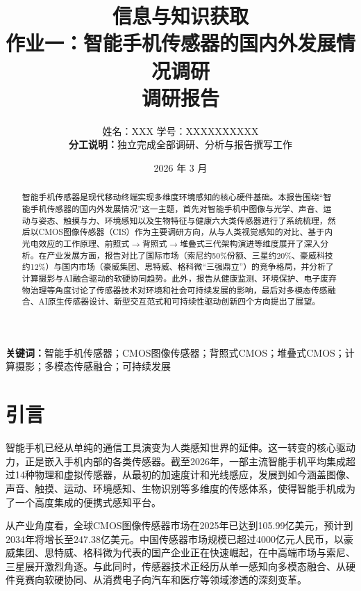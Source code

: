 \documentclass[12pt, a4paper]{ctexart}
\title{
    \vspace{1cm}
    {\LARGE \textbf{信息与知识获取}} \\[0.6cm]
    {\Large 作业一：智能手机传感器的国内外发展情况调研} \\[0.4cm]
    {\large 调研报告}
    \vspace{0.5cm}
}
\author{
    姓名：XXX \quad 学号：XXXXXXXXXX \\[0.2cm]
    \textbf{分工说明：}独立完成全部调研、分析与报告撰写工作
}
\date{2026 年 3 月}
\begin{document}
\maketitle
\thispagestyle{empty}
\newpage

\setcounter{page}{1}
\begin{abstract}
智能手机传感器是现代移动终端实现多维度环境感知的核心硬件基础。本报告围绕``智能手机传感器的国内外发展情况''这一主题，首先对智能手机中图像与光学、声音、运动与姿态、触摸与力、环境感知以及生物特征与健康六大类传感器进行了系统梳理，然后以CMOS图像传感器（CIS）作为主要调研方向，从与人类视觉感知的对比、基于内光电效应的工作原理、前照式$\to$背照式$\to$堆叠式三代架构演进等维度展开了深入分析。在产业发展方面，报告对比了国际市场（索尼约50\%份额、三星约20\%、豪威科技约12\%）与国内市场（豪威集团、思特威、格科微``三强鼎立''）的竞争格局，并分析了计算摄影与AI融合驱动的软硬协同趋势。此外，报告从健康监测、环境保护、电子废弃物治理等角度讨论了传感器技术对环境和社会可持续发展的影响，最后对多模态传感融合、AI原生传感器设计、新型交互范式和可持续性驱动创新四个方向提出了展望。
\end{abstract}

\noindent\textbf{关键词：}智能手机传感器；CMOS图像传感器；背照式CMOS；堆叠式CMOS；计算摄影；多模态传感融合；可持续发展

\newpage
\tableofcontents
\newpage


\section{引言}

智能手机已经从单纯的通信工具演变为人类感知世界的延伸。这一转变的核心驱动力，正是嵌入手机内部的各类传感器。截至2026年，一部主流智能手机平均集成超过14种物理和虚拟传感器\cite{alibaba2026}，从最初的加速度计和光线感应，发展到如今涵盖图像、声音、触摸、运动、环境感知、生物识别等多维度的传感体系，使得智能手机成为了一个高度集成的便携式感知平台。

从产业角度看，全球CMOS图像传感器市场在2025年已达到105.99亿美元，预计到2034年将增长至247.38亿美元\cite{statsmarket2026}。中国传感器市场规模已超过4000亿元人民币\cite{eetChina2025}，以豪威集团、思特威、格科微为代表的国产企业正在快速崛起，在中高端市场与索尼、三星展开激烈角逐。与此同时，传感器技术正经历从单一感知向多模态融合、从硬件竞赛向软硬协同、从消费电子向汽车和医疗等领域渗透的深刻变革。
\end{document}

